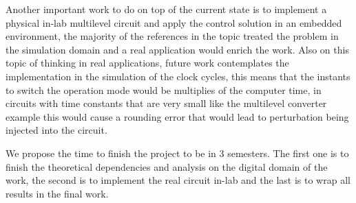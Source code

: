 Another important work to do on top of the current state is to implement a physical in-lab multilevel circuit and apply the 
control solution in an embedded environment, the majority of the references in the topic treated the problem in the simulation domain 
and a real application would enrich the work. Also on this topic of thinking in real applications, future work contemplates the
implementation in the simulation of the clock cycles, this means that the instants to switch the operation mode would be multiplies of the
computer time, in circuits with time constants that are very small like the multilevel converter example this would cause a rounding error
that would lead to perturbation being injected into the circuit.

We propose the time to finish the project to be in 3 semesters. The first one is to finish the theoretical dependencies and analysis  
on the digital domain of the work, the second is to implement the real circuit in-lab and the last is to wrap all results in the final work.